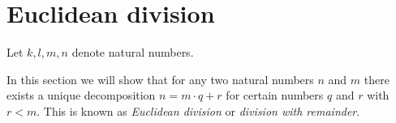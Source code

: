 \documentclass[../../arithmetic.tex]{subfiles}
\begin{document}
  \section{Euclidean division}

  \begin{forthel}
  \end{forthel}

  \begin{forthel}
    Let $k, l, m, n$ denote natural numbers.
  \end{forthel}

  \noindent In this section we will show that for any two natural numbers $n$
  and $m$ there exists a unique decomposition $n = m \cdot q + r$ for certain
  numbers $q$ and $r$ with $r < m$. This is known as \textit{Euclidean
  division} or \textit{division with remainder}.
\end{document}
